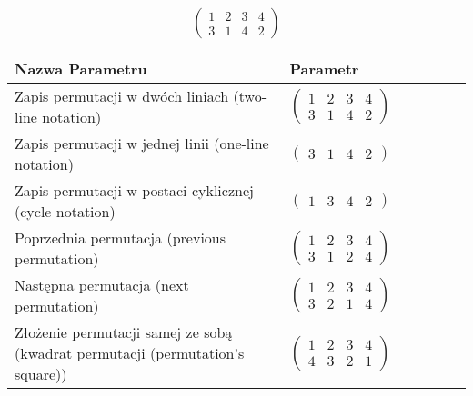\documentclass[12pt]{article}
\begin{document}
\subsection{}
\begin{center}
\[
\begin{pmatrix}
	1 & 2 & 3 & 4 \\ 
	3 & 1 & 4 & 2 
\end{pmatrix}
\]

\begin{tabular}{|m{0.6\linewidth}|m{0.4\linewidth}|}
	\hline
	Nazwa Parametru & Parametr \\
	\hline
	Zapis permutacji w dwóch liniach (two-line notation) & $\begin{pmatrix} 1 & 2 & 3 & 4 \\ 
3 & 1 & 4 & 2 \end{pmatrix}$ \\ 
	\hline
	Zapis permutacji w jednej linii (one-line notation) & $\begin{pmatrix} 3 & 1 & 4 & 2 \end{pmatrix}$ \\ 
	\hline
	Zapis permutacji w postaci cyklicznej (cycle notation) & $\begin{pmatrix} 1 & 3 & 4 & 2 \end{pmatrix} $ \\ 
	\hline
	Poprzednia permutacja (previous permutation) & $\begin{pmatrix} 1 & 2 & 3 & 4 \\ 
3 & 1 & 2 & 4 \end{pmatrix}$ \\ 
	\hline
	Następna permutacja (next permutation) & $\begin{pmatrix} 1 & 2 & 3 & 4 \\ 
3 & 2 & 1 & 4 \end{pmatrix}$ \\ 
	\hline
	Złożenie permutacji samej ze sobą (kwadrat permutacji (permutation's square)) & $\begin{pmatrix} 1 & 2 & 3 & 4 \\ 
4 & 3 & 2 & 1 \end{pmatrix}$ \\ 
	\hline
\end{tabular}
\end{center}
\end{document}
